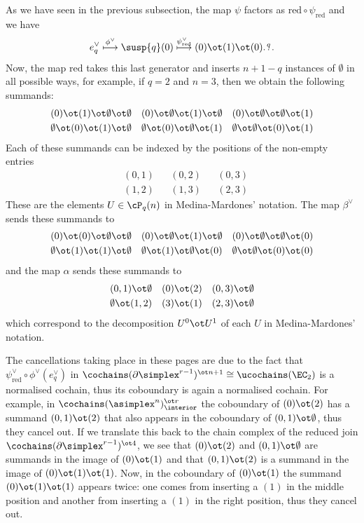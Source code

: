 \begin{remark}
	As we have seen in the previous subsection, the map $\psi$ factors as $\mathrm{red}\circ \psi_{\mathrm{red}}$ and we have
	\[
		e_q^{\vee}\overset{\phi^\vee}{\longmapsto}
		\susp{q}(0)\overset{\psi^\vee_{\mathrm{red}}}{\longmapsto}
		(0)\ot(1)\ot(0)\overset{q}{\ldots} 
	\]
	Now, the map $\mathrm{red}$ takes this last generator and inserts $n+1-q$ instances of $\emptyset$ in all possible ways, for example, if $q=2$ and $n=3$, then we obtain the following summands:
	\begin{align*}
		&(0)\ot(1)\ot\emptyset\ot\emptyset
		&
		&(0)\ot\emptyset\ot(1)\ot\emptyset
		&
		&(0)\ot\emptyset\ot\emptyset\ot(1)
		\\
		&\emptyset\ot(0)\ot(1)\ot\emptyset
		&
		&\emptyset\ot(0)\ot\emptyset\ot(1)
		&
		&\emptyset\ot\emptyset\ot(0)\ot(1)
	\end{align*}
	Each of these summands can be indexed by the positions of the non-empty entries
	\begin{align*}
		&(0,1)&& (0,2)&&(0,3)
		\\
		&(1,2)&& (1,3) &&(2,3)
	\end{align*}
	These are the elements $U\in \cP_q(n)$ in Medina-Mardones' notation. The map $\beta^\vee$ sends these summands to
	\begin{align*}
		&(0)\ot(0)\ot\emptyset\ot\emptyset
		&
		&(0)\ot\emptyset\ot(1)\ot\emptyset
		&
		&(0)\ot\emptyset\ot\emptyset\ot(0)
		\\
		&\emptyset\ot(1)\ot(1)\ot\emptyset
		&
		&\emptyset\ot(1)\ot\emptyset\ot(0)
		&
		&\emptyset\ot\emptyset\ot(0)\ot(0)
	\end{align*}
	and the map $\alpha$ sends these summands to
	\begin{align*}
		&(0,1)\ot \emptyset
		&
		&(0)\ot (2)
		&
		&(0,3)\ot \emptyset
		\\
		&\emptyset\ot(1,2)
		&
		&(3)\ot (1)
		&
		&(2,3)\ot\emptyset
	\end{align*}
	which correspond to the decomposition $U^0\ot U^1$ of each $U$ in Medina-Mardones' notation. 

	The cancellations taking place in these pages are due to the fact that $\psi_{\mathrm{red}}^\vee \circ \phi^\vee(e_q^\vee)$ in $\cochains(\partial\simplex^{r-1})^{\ot n+1}\cong \ucochains(\EC_2)$ is a normalised cochain, thus its coboundary is again a normalised cochain. For example, in $\cochains(\asimplex^{n})^{\ot r}_{\interior}$ the coboundary of $(0)\ot (2)$ has a summand $(0,1)\ot (2)$ that also appears in the coboundary of $(0,1)\ot\emptyset$, thus they cancel out. If we translate this back to the chain complex of the reduced join $\cochains(\partial\simplex^{r-1})^{\ot 4}$, we see that $(0)\ot (2)$ and $(0,1)\ot\emptyset$ are summands in the image of $(0)\ot (1)$ and that $(0,1)\ot (2)$ is a summand in the image of $(0)\ot (1)\ot(1)$. Now, in the coboundary of $(0)\ot (1)$ the summand $(0)\ot (1)\ot(1)$ appears twice: one comes from inserting a $(1)$ in the middle position and another from inserting a $(1)$ in the right position, thus they cancel out.
\end{remark}